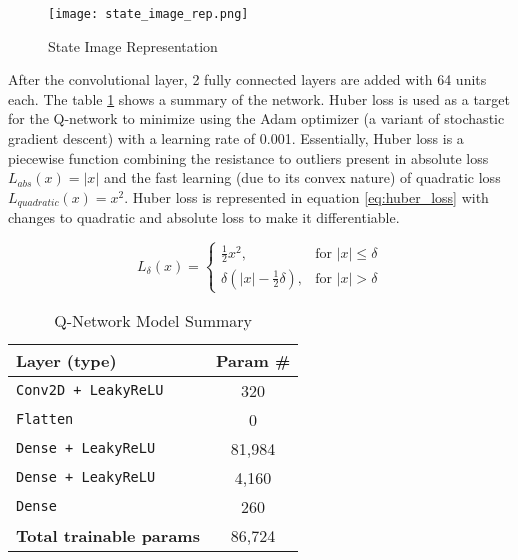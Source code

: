 \documentclass[letterpaper]{article} %
\begin{document}
\begin{figure}[htbp]
  \centering
  \texttt{[image: state\_image\_rep.png]}
  \caption{State Image Representation}
  \label{fig:state_image_rep}
\end{figure}

After the convolutional layer, 2 fully connected layers are added with 64 units each. The table \ref{tab:model_summary} shows a summary of the network.
Huber loss is used as a target for the Q-network to minimize using the Adam optimizer (a variant of stochastic gradient descent) with a learning rate of 0.001.
Essentially, Huber loss is a piecewise function combining the resistance to outliers present in absolute loss $L_{abs}(x) = |x|$ and the fast learning (due to its convex nature) of quadratic loss $L_{quadratic}(x) = x^2$.
Huber loss is represented in equation \ref{eq:huber_loss} with changes to quadratic and absolute loss to make it differentiable.

\begin{equation}
   \label{eq:huber_loss}
    L_{\delta}(x) = \left\{ 
    \begin{array}{ll}
      \frac{1}{2}x^{2}, & \text{for } |x| \leq \delta \\
      \delta\left(|x| - \frac{1}{2}\delta\right), & \text{for } |x| > \delta
    \end{array}
    \right.
\end{equation}

\begin{table}[h]
\centering
\begin{tabular}{lc}
\hline
\textbf{Layer (type)}              & \textbf{Param \#} \\ \hline
\texttt{Conv2D + LeakyReLU}        & 320       \\
\texttt{Flatten}                   & 0         \\
\texttt{Dense + LeakyReLU}         & 81,984    \\
\texttt{Dense + LeakyReLU}         & 4,160     \\
\texttt{Dense}                     & 260       \\ \hline
\textbf{Total trainable params}    & 86,724    \\ \hline
\end{tabular}
\caption{Q-Network Model Summary}
\label{tab:model_summary}
\end{table}
\end{document}
